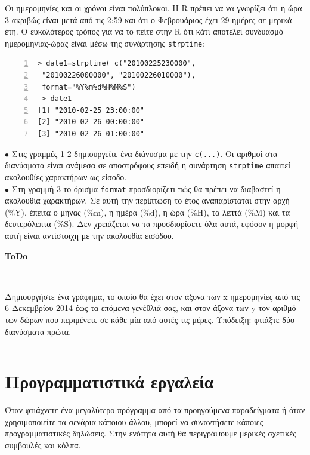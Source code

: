\documentclass[a4paper,10pt,twocolumn]{article}
\newenvironment{ToDo} {
  \begin{flushright}
    \hfill
    \begin{minipage}{0.9\columnwidth}
    \textsf{\textbf{ToDo}} \\
      \vspace{-0.7cm}\\
      {\color{Gray}\rule[-0.05cm]{\columnwidth}{1.5pt}}} {
      {\color{Gray}\rule[0.3cm]{\columnwidth}{1.5pt}}
    \end{minipage}
    \vspace{0.3cm}
  \end{flushright}
  }
\begin{document}
Οι ημερομηνίες και οι χρόνοι είναι πολύπλοκοι. Η R πρέπει να να γνωρίζει ότι η ώρα 3 ακριβώς είναι μετά από
τις 2:59 και ότι ο Φεβρουάριος έχει 29 ημέρες σε μερικά έτη. Ο ευκολότερος τρόπος για να το πείτε στην R ότι
κάτι αποτελεί συνδυασμό ημερομηνίας-ώρας είναι μέσω της συνάρτησης \texttt{strptime}:

\begin{Verbatim}[frame=single,numbers=left,gobble=0, xleftmargin=0.35cm, numbersep=0.1cm]
> date1=strptime( c("20100225230000", 
 "20100226000000", "20100226010000"), 
 format="%Y%m%d%H%M%S")
 > date1
[1] "2010-02-25 23:00:00" 
[2] "2010-02-26 00:00:00" 
[3] "2010-02-26 01:00:00"
\end{Verbatim}

\noindent $\bullet$  Στις γραμμές 1-2 δημιουργείτε ένα διάνυσμα με την \texttt{c(...)}. Οι αριθμοί στα 
διανύσματα είναι ανάμεσα σε αποστρόφους επειδή η συνάρτηση \texttt{strptime} απαιτεί ακολουθίες χαρακτήρων ως
είσοδο.\\
\noindent $\bullet$ Στη γραμμή 3 το όρισμα \texttt{format} προσδιορίζετι πώς θα πρέπει να διαβαστεί η ακολουθία
χαρακτήρων. Σε αυτή την περίπτωση το έτος αναπαρίσταται στην αρχή (\%Y), έπειτα ο μήνας (\%m), η ημέρα (\%d),
η ώρα (\%H), τα λεπτά (\%M) και τα δευτερόλεπτα (\%S). Δεν χρειάζεται να τα προσδιορίσετε όλα αυτά, εφόσον η
μορφή αυτή είναι αντίστοιχη με την ακολουθία εισόδου.

\begin{ToDo}
Δημιουργήστε ένα γράφημα, το οποίο θα έχει στον άξονα των x ημερομηνίες από τις 6 Δεκεμβρίου 2014 έως τα επόμενα 
γενέθλιά σας, και στον άξονα των y τον αριθμό των δώρων που περιμένετε σε κάθε μία από αυτές τις μέρες.
Υπόδειξη: φτιάξτε δύο διανύσματα πρώτα.
\end{ToDo}

\section{Προγραμματιστικά εργαλεία}

Όταν φτιάχνετε ένα μεγαλύτερο πρόγραμμα από τα προηγούμενα παραδείγματα ή όταν χρησιμοποιείτε τα σενάρια κάποιου
άλλου, μπορεί να συναντήσετε κάποιες προγραμματιστικές  δηλώσεις. Στην ενότητα αυτή θα περιγράψουμε μερικές
σχετικές συμβουλές και κόλπα.
\end{document}
